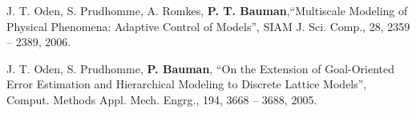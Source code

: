 \blankline

J. T. Oden, S. Prudhomme, A. Romkes, \textbf{P. T. Bauman},``Multiscale Modeling of Physical Phenomena: Adaptive Control of Models'', SIAM J. Sci. Comp., 28, 2359 -- 2389, 2006.

\blankline

J. T. Oden, S. Prudhomme, \textbf{P. Bauman}, ``On the Extension of Goal-Oriented Error Estimation and Hierarchical Modeling to Discrete Lattice Models'', Comput. Methods Appl. Mech. Engrg., 194, 3668 -- 3688, 2005.



